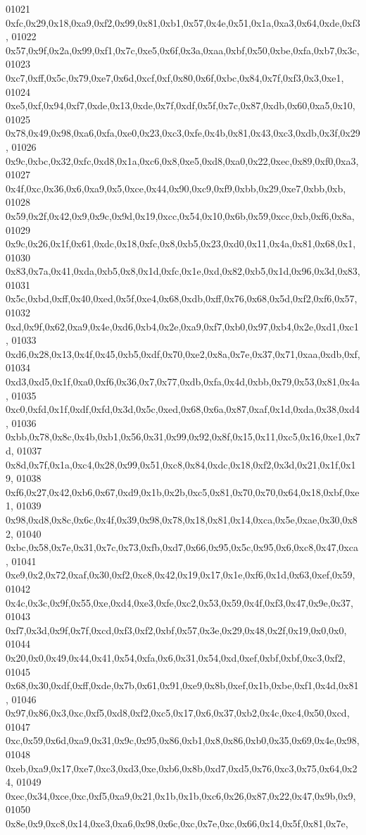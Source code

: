 \begin{DoxyCode}
01021   0xfc,0x29,0x18,0xa9,0xf2,0x99,0x81,0xb1,0x57,0x4e,0x51,0x1a,0xa3,0x64,0xde,0xf3,
01022   0x57,0x9f,0x2a,0x99,0xf1,0x7c,0xe5,0x6f,0x3a,0xaa,0xbf,0x50,0xbe,0xfa,0xb7,0x3c,
01023   0xc7,0xff,0x5c,0x79,0xe7,0x6d,0xcf,0xf,0x80,0x6f,0xbc,0x84,0x7f,0xf3,0x3,0xe1,
01024   0xe5,0xf,0x94,0xf7,0xde,0x13,0xde,0x7f,0xdf,0x5f,0x7c,0x87,0xdb,0x60,0xa5,0x10,
01025   0x78,0x49,0x98,0xa6,0xfa,0xe0,0x23,0xc3,0xfe,0x4b,0x81,0x43,0xc3,0xdb,0x3f,0x29,
01026   0x9c,0xbc,0x32,0xfc,0xd8,0x1a,0xc6,0x8,0xe5,0xd8,0xa0,0x22,0xec,0x89,0xf0,0xa3,
01027   0x4f,0xc,0x36,0x6,0xa9,0x5,0xce,0x44,0x90,0xc9,0xf9,0xbb,0x29,0xe7,0xbb,0xb,
01028   0x59,0x2f,0x42,0x9,0x9c,0x9d,0x19,0xcc,0x54,0x10,0x6b,0x59,0xcc,0xb,0xf6,0x8a,
01029   0x9c,0x26,0x1f,0x61,0xdc,0x18,0xfc,0x8,0xb5,0x23,0xd0,0x11,0x4a,0x81,0x68,0x1,
01030   0x83,0x7a,0x41,0xda,0xb5,0x8,0x1d,0xfc,0x1e,0xd,0x82,0xb5,0x1d,0x96,0x3d,0x83,
01031   0x5c,0xbd,0xff,0x40,0xed,0x5f,0xe4,0x68,0xdb,0xff,0x76,0x68,0x5d,0xf2,0xf6,0x57,
01032   0xd,0x9f,0x62,0xa9,0x4e,0xd6,0xb4,0x2e,0xa9,0xf7,0xb0,0x97,0xb4,0x2e,0xd1,0xc1,
01033   0xd6,0x28,0x13,0x4f,0x45,0xb5,0xdf,0x70,0xe2,0x8a,0x7e,0x37,0x71,0xaa,0xdb,0xf,
01034   0xd3,0xd5,0x1f,0xa0,0xf6,0x36,0x7,0x77,0xdb,0xfa,0x4d,0xbb,0x79,0x53,0x81,0x4a,
01035   0xc0,0xfd,0x1f,0xdf,0xfd,0x3d,0x5c,0xed,0x68,0x6a,0x87,0xaf,0x1d,0xda,0x38,0xd4,
01036   0xbb,0x78,0x8c,0x4b,0xb1,0x56,0x31,0x99,0x92,0x8f,0x15,0x11,0xc5,0x16,0xe1,0x7d,
01037   0x8d,0x7f,0x1a,0xc4,0x28,0x99,0x51,0xc8,0x84,0xdc,0x18,0xf2,0x3d,0x21,0x1f,0x19,
01038   0xf6,0x27,0x42,0xb6,0x67,0xd9,0x1b,0x2b,0xc5,0x81,0x70,0x70,0x64,0x18,0xbf,0xe1,
01039   0x98,0xd8,0x8c,0x6c,0x4f,0x39,0x98,0x78,0x18,0x81,0x14,0xca,0x5e,0xae,0x30,0x82,
01040   0xbc,0x58,0x7e,0x31,0x7c,0x73,0xfb,0xd7,0x66,0x95,0x5c,0x95,0x6,0xc8,0x47,0xca,
01041   0xe9,0x2,0x72,0xaf,0x30,0xf2,0xc8,0x42,0x19,0x17,0x1e,0xf6,0x1d,0x63,0xef,0x59,
01042   0x4c,0x3c,0x9f,0x55,0xe,0xd4,0xe3,0xfe,0xc2,0x53,0x59,0x4f,0xf3,0x47,0x9e,0x37,
01043   0xf7,0x3d,0x9f,0x7f,0xcd,0xf3,0xf2,0xbf,0x57,0x3e,0x29,0x48,0x2f,0x19,0x0,0x0,
01044   0x20,0x0,0x49,0x44,0x41,0x54,0xfa,0x6,0x31,0x54,0xd,0xef,0xbf,0xbf,0xc3,0xf2,
01045   0x68,0x30,0xdf,0xff,0xde,0x7b,0x61,0x91,0xe9,0x8b,0xef,0x1b,0xbe,0xf1,0x4d,0x81,
01046   0x97,0x86,0x3,0xc,0xf5,0xd8,0xf2,0xc5,0x17,0x6,0x37,0xb2,0x4c,0xc4,0x50,0xcd,
01047   0xc,0x59,0x6d,0xa9,0x31,0x9c,0x95,0x86,0xb1,0x8,0x86,0xb0,0x35,0x69,0x4e,0x98,
01048   0xeb,0xa9,0x17,0xe7,0xc3,0xd3,0xe,0xb6,0x8b,0xd7,0xd5,0x76,0xc3,0x75,0x64,0x24,
01049   0xec,0x34,0xce,0xc,0xf5,0xa9,0x21,0x1b,0x1b,0xc6,0x26,0x87,0x22,0x47,0x9b,0x9,
01050   0x8e,0x9,0xc8,0x14,0xe3,0xa6,0x98,0x6c,0xc,0x7e,0xc,0x66,0x14,0x5f,0x81,0x7e,

\end{DoxyCode}
